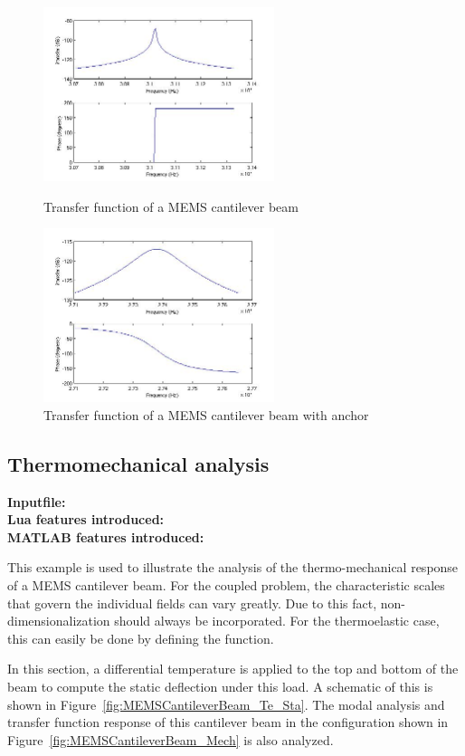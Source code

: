 \begin{figure}
\centering
\includegraphics[height = 2in]{fig/mems_cant_m_tra.jpg}
\caption{Transfer function of a MEMS cantilever beam}
\label{fig:MEMSCantileverBeamTransfer}
\includegraphics[height = 2in]{fig/mems_cant_wa_m_tra.jpg}
\caption{Transfer function of a MEMS cantilever beam with anchor}
\label{fig:MEMSCantileverBeamWaTransfer}
\end{figure}


\clearpage
\subsection{Thermomechanical analysis}
\begin{flushleft}
  \textbf{Inputfile:}
  \\
  \textbf{Lua features introduced:}
  \\
  \textbf{MATLAB features introduced:}
\end{flushleft}
This example is used to illustrate the analysis of the
thermo-mechanical response of a MEMS cantilever beam. For the coupled 
problem, the characteristic scales that govern the individual 
fields can vary greatly. Due to this fact, non-dimensionalization
should always be incorporated. For the thermoelastic case, this
can easily be done by defining the  function.

In this section, a differential temperature is applied to the
top and bottom of the beam to compute the static deflection
under this load. A schematic of this is shown in 
Figure~\ref{fig:MEMSCantileverBeam_Te_Sta}.
The modal analysis and transfer function response of this cantilever
beam in the configuration shown in 
Figure~\ref{fig:MEMSCantileverBeam_Mech} is also analyzed.

